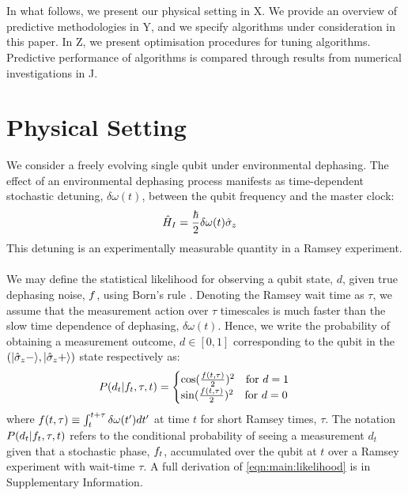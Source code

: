 \\
\\
In what follows, we present our physical setting in X. We provide an overview of predictive methodologies in Y, and we specify algorithms under consideration in this paper. In Z, we present optimisation procedures for tuning algorithms. Predictive performance of algorithms is compared through results from numerical investigations in J. 


\section{Physical Setting}  
\label{sec:main:1}
We consider a freely evolving single qubit under environmental dephasing. The effect of an environmental dephasing process manifests as time-dependent stochastic detuning, $\delta \omega (t)$, between the qubit frequency and the master clock:
\begin{align}
\hat{H}_I & = \frac{\hbar}{2}\delta \omega (t) \hat{\sigma}_{z}
\end{align}
This detuning is an experimentally measurable quantity in a Ramsey experiment.
\\
\\
We may define the statistical likelihood for observing a qubit state, $d$, given true dephasing noise, $f$, using Born's rule \cite{ferrie2013}. Denoting the Ramsey wait time as $\tau$, we assume that the measurement action over $\tau$ timescales is much faster than the slow time dependence of dephasing,  $\delta \omega(t)$. Hence, we write the probability of obtaining a measurement outcome, $d \in [0,1]$ corresponding to the qubit in the $(| \hat{\sigma}_{z}- \rangle, | \hat{\sigma}_{z}+ \rangle)$ state respectively as:
\begin{align}
P(d_t | f_t, \tau, t) &= \begin{cases} \cos(\frac{f(t,\tau)}{2})^2 \quad \text{for $d=1$} \\   \sin(\frac{f(t,\tau)}{2})^2  \quad \text{for $ d=0$} \end{cases} \label{eqn:main:likelihood}
\end{align}
where  $ f(t,\tau) \equiv \int_{t}^{t+\tau} \delta \omega(t') dt'$ at time $t$ for short Ramsey times, $\tau$. The notation $P(d_t | f_t, \tau, t)$ refers to the conditional probability of seeing a measurement $d_t$ given that a stochastic phase, $f_t$, accumulated over the qubit at $t$ over a Ramsey experiment with wait-time $\tau$. A full derivation of \cref{eqn:main:likelihood} is in Supplementary Information.

